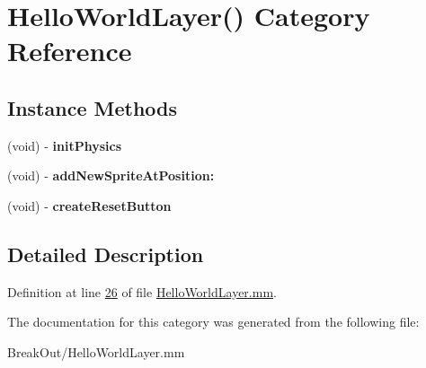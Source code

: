 \hypertarget{category_hello_world_layer_07_08}{\section{Hello\-World\-Layer() Category Reference}
\label{d1/d30/category_hello_world_layer_07_08}
}
\subsection*{Instance Methods}
\begin{DoxyCompactItemize}
\item 
\hypertarget{category_hello_world_layer_07_08_ab3500df9c05677d31170bcb07a82f522}{(void) -\/ {\bfseries init\-Physics}}\label{d1/d30/category_hello_world_layer_07_08_ab3500df9c05677d31170bcb07a82f522}

\item 
\hypertarget{category_hello_world_layer_07_08_a1d9f76267b1dabaa3f25f7530ef0b062}{(void) -\/ {\bfseries add\-New\-Sprite\-At\-Position\-:}}\label{d1/d30/category_hello_world_layer_07_08_a1d9f76267b1dabaa3f25f7530ef0b062}

\item 
\hypertarget{category_hello_world_layer_07_08_a816e77da1323550bd1bb9ad89354dec1}{(void) -\/ {\bfseries create\-Reset\-Button}}\label{d1/d30/category_hello_world_layer_07_08_a816e77da1323550bd1bb9ad89354dec1}

\end{DoxyCompactItemize}


\subsection{Detailed Description}


Definition at line \hyperlink{_hello_world_layer_8mm_source_l00026}{26} of file \hyperlink{_hello_world_layer_8mm_source}{Hello\-World\-Layer.\-mm}.



The documentation for this category was generated from the following file\-:\begin{DoxyCompactItemize}
\item 
Break\-Out/Hello\-World\-Layer.\-mm\end{DoxyCompactItemize}
